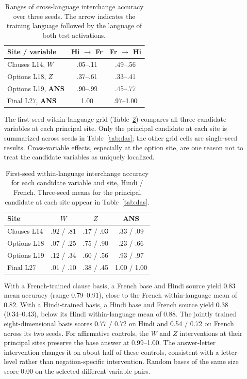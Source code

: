 \documentclass[11pt]{article}
\begin{document}
\begin{table}[t]
\small\centering
\begin{tabularx}{\linewidth}{@{}Xcc@{}}
\toprule
Site / variable & Hi $\rightarrow$ Fr & Fr $\rightarrow$ Hi \\
\midrule
Clauses L14, $W$ & .05--.11 & .49--.56 \\
Options L18, $Z$ & .37--.61 & .33--.41 \\
Options L19, \textbf{ANS} & .90--.99 & .45--.77 \\
Final L27, \textbf{ANS} & 1.00 & .97--1.00 \\
\bottomrule
\end{tabularx}
\caption{Ranges of cross-language interchange accuracy over three seeds. The arrow indicates the training language followed by the language of both test activations.}
\label{tab:seedrange}
\end{table}

The first-seed within-language grid (Table~\ref{tab:allvars}) compares all three candidate variables at each principal site. Only the principal candidate at each site is summarized across seeds in Table~\ref{tab:das}; the other grid cells are single-seed results. Cross-variable effects, especially at the option site, are one reason not to treat the candidate variables as uniquely localized.

\begin{table}[t]
\small\centering
\begin{tabularx}{\linewidth}{@{}Xccc@{}}
\toprule
Site & $W$ & $Z$ & \textbf{ANS} \\
\midrule
Clauses L14 & .92 / .81 & .17 / .03 & .33 / .09 \\
Options L18 & .07 / .25 & .75 / .90 & .23 / .66 \\
Options L19 & .12 / .34 & .60 / .56 & .93 / .97 \\
Final L27 & .01 / .10 & .38 / .45 & 1.00 / 1.00 \\
\bottomrule
\end{tabularx}
\caption{First-seed within-language interchange accuracy for each candidate variable and site, Hindi / French. Three-seed means for the principal candidate at each site appear in Table~\ref{tab:das}.}
\label{tab:allvars}
\end{table}

With a French-trained clause basis, a French base and Hindi source yield 0.83 mean accuracy (range 0.79--0.91), close to the French within-language mean of 0.82. With a Hindi-trained basis, a Hindi base and French source yield 0.38 (0.34--0.43), below its Hindi within-language mean of 0.88. The jointly trained eight-dimensional basis scores 0.77 / 0.72 on Hindi and 0.54 / 0.72 on French across its two seeds.
For affirmative controls, the $W$ and $Z$ interventions at their principal sites preserve the base answer at 0.99--1.00. The answer-letter intervention changes it on about half of these controls, consistent with a letter-level rather than negation-specific intervention. Random bases of the same size score 0.00 on the selected different-variable pairs.
\end{document}
